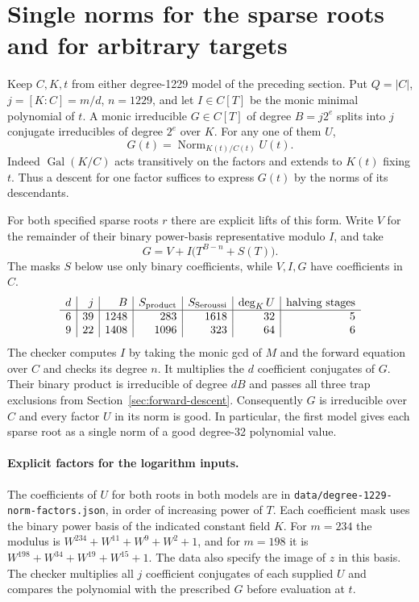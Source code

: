\documentclass[11pt]{article}
\begin{document}
\section{Single norms for the sparse roots and for arbitrary targets}
\label{sec:single-norm-lifts}
Keep \(C,K,t\) from either degree-1229 model of the preceding section.
Put \(Q=|C|\), \(j=[K:C]=m/d\), \(n=1229\), and let \(I\in C[T]\) be the
monic minimal polynomial of \(t\). A monic irreducible \(G\in C[T]\)
of degree \(B=j2^e\) splits into \(j\) conjugate irreducibles of degree
\(2^e\) over \(K\). For any one of them \(U\),
\[
 G(t)=\operatorname{Norm}_{K(t)/C(t)}U(t).
\]
Indeed \(\operatorname{Gal}(K/C)\) acts transitively on the factors and
extends to \(K(t)\) fixing \(t\). Thus a descent for one factor suffices
to express \(G(t)\) by the norms of its descendants.

For both specified sparse roots \(r\) there are explicit lifts of this
form. Write \(V\) for the remainder of their binary power-basis
representative modulo \(I\), and take
\[
 G= V+I\bigl(T^{B-n}+S(T)\bigr).
\]
The masks \(S\) below use only binary coefficients, while \(V,I,G\)
have coefficients in \(C\).
\[
\begin{array}{r|r|r|r|r|r|r}
d&j&B&S_{\rm product}&S_{\rm Seroussi}&\deg_K U&
   \text{halving stages}\\\hline
6&39&1248&283&1618&32&5\\
9&22&1408&1096&323&64&6
\end{array}
\]
The checker computes \(I\) by taking the monic gcd of \(M\) and the
forward equation over \(C\) and checks its degree \(n\). It multiplies
the \(d\) coefficient conjugates of \(G\). Their binary product is
irreducible of degree \(dB\) and passes all three trap exclusions from
Section~\ref{sec:forward-descent}. Consequently \(G\) is irreducible
over \(C\) and every factor \(U\) in its norm is good. In particular,
the first model gives each sparse root as a single norm of a good
degree-32 polynomial value.

\paragraph{Explicit factors for the logarithm inputs.}
The coefficients of \(U\) for both roots in both models are in
\nolinkurl{data/degree-1229-norm-factors.json}, in order of increasing
power of \(T\). Each coefficient mask uses the binary power basis of
the indicated constant field \(K\). For \(m=234\) the modulus is
\(W^{234}+W^{11}+W^9+W^2+1\), and for \(m=198\) it is
\(W^{198}+W^{34}+W^{19}+W^{15}+1\). The data also specify the image
of \(z\) in this basis. The checker multiplies all \(j\) coefficient
conjugates of each supplied \(U\) and compares the polynomial with
the prescribed \(G\) before evaluation at \(t\).
\end{document}
